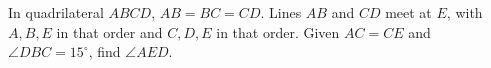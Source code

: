 In quadrilateral $ABCD$, $AB=BC=CD$. Lines $AB$ and $CD$ meet at $E$, with $A,B,E$ in that order and $C,D,E$ in that order. Given $AC=CE$ and $\angle DBC=15^\circ$, find $\angle AED$.
